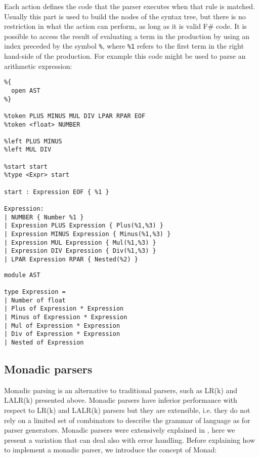 \noindent
Each action defines the code that the parser executes when that rule is matched. Usually this part is used to build the nodes of the syntax tree, but there is no restriction in what the action can perform, as long as it is valid F\# code. It is possible to access the result of evaluating a term in the production by using an index preceded by the symbol \texttt{\%}, where \texttt{\%1} refers to the first term in the right hand-side of the production. For example this code might be used to parse an arithmetic expression:

\begin{lstlisting}
%{
  open AST
%}

%token PLUS MINUS MUL DIV LPAR RPAR EOF
%token <float> NUMBER

%left PLUS MINUS
%left MUL DIV

%start start
%type <Expr> start

start : Expression EOF { %1 }

Expression:
| NUMBER { Number %1 }
| Expression PLUS Expression { Plus(%1,%3) }
| Expression MINUS Expression { Minus(%1,%3) }
| Expression MUL Expression { Mul(%1,%3) }
| Expression DIV Expression { Div(%1,%3) }
| LPAR Expression RPAR { Nested(%2) }
\end{lstlisting}

\begin{lstlisting}
module AST

type Expression =
| Number of float
| Plus of Expression * Expression
| Minus of Expression * Expression
| Mul of Expression * Expression
| Div of Expression * Expression
| Nested of Expression
\end{lstlisting}



\subsection{Monadic parsers}
\label{sec:ch_background_parser_monad}
Monadic parsing is an alternative to traditional parsers, such as LR(k) and LALR(k) presented above. Monadic parsers have inferior performance with respect to LR(k) and LALR(k) \cite{hutton1998monadic} parsers but they are extensible, i.e. they do not rely on a limited set of combinators to describe the grammar of language as for parser generators. Monadic parsers were extensively explained in \cite{hutton1998monadic, wadler1995monads}, here we present a variation that can deal also with error handling. Before explaining how to implement a monadic parser, we introduce the concept of Monad:

